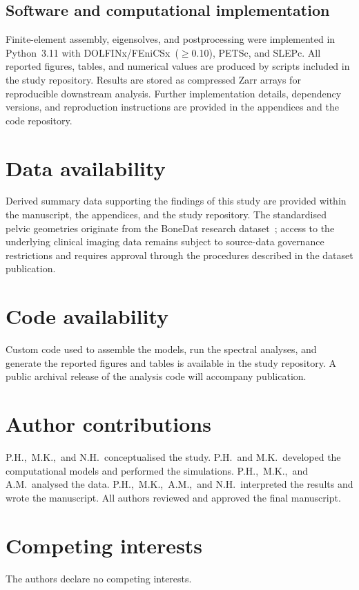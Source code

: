 \documentclass[11pt]{article}
\begin{document}
\subsection{Software and computational implementation}


Finite-element assembly, eigensolves, and postprocessing were implemented in Python~3.11 with DOLFINx/FEniCSx~($\ge$0.10), PETSc, and SLEPc.
All reported figures, tables, and numerical values are produced by scripts included in the study repository.
Results are stored as compressed Zarr arrays for reproducible downstream analysis.
Further implementation details, dependency versions, and reproduction instructions are provided in the appendices and the code repository.

\section*{Data availability}
Derived summary data supporting the findings of this study are provided within the manuscript, the appendices, and the study repository.
The standardised pelvic geometries originate from the BoneDat research dataset~\citep{HenyssKuchar2025BoneDat}; access to the underlying clinical imaging data remains subject to source-data governance restrictions and requires approval through the procedures described in the dataset publication.

\section*{Code availability}
Custom code used to assemble the models, run the spectral analyses, and generate the reported figures and tables is available in the study repository.
A public archival release of the analysis code will accompany publication.

\section*{Author contributions}
P.H.,\ M.K.,\ and N.H.\ conceptualised the study.
P.H.\ and M.K.\ developed the computational models and performed the simulations.
P.H.,\ M.K.,\ and A.M.\ analysed the data.
P.H.,\ M.K.,\ A.M.,\ and N.H.\ interpreted the results and wrote the manuscript.
All authors reviewed and approved the final manuscript.

\section*{Competing interests}
The authors declare no competing interests.
\end{document}
